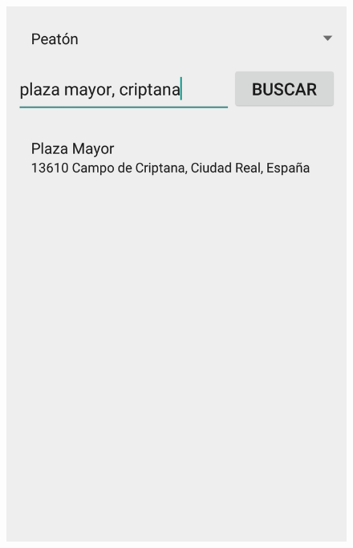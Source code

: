 \begin{slide}
\begin{center}
\begin{minipage}[b]{0.3\linewidth}
\begin{center}
      \end{center}
    \end{minipage}
    \begin{minipage}[b]{0.3\linewidth}
      \begin{center}
        \begin{figure}
          \includegraphics[height=0.65\textheight]{img/naviganto-destinobuscado.png}
        \end{figure}
      \end{center}
    \end{minipage}
    \begin{minipage}[b]{0.3\linewidth}
      \begin{center}
        \begin{figure}

\end{figure}
\end{center}
\end{minipage}
\end{center}
\end{slide}
